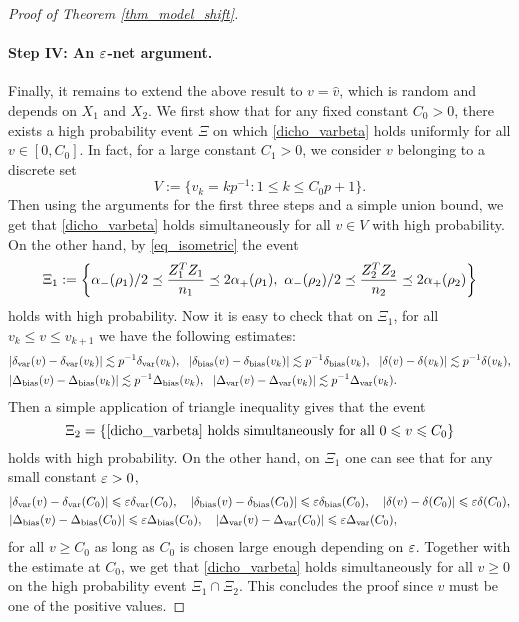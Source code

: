 \begin{proof}[Proof of Theorem \ref{thm_model_shift}]
\paragraph{Step IV: An $\e$-net argument.} Finally, it remains to extend the above result to $v=\hat v$, which is random and depends on $X_1$ and $X_2$. We first show that for any fixed constant $C_0>0$, there exists a high probability event $\Xi$ on which \eqref{dicho_varbeta} 
holds uniformly for all $v\in [0, C_0]$. In fact, for a large constant $C_1>0$, we consider $v$ belonging to a discrete set 
$$V:=\{v_k = kp^{-1}: 1\le k \le C_0p +1\}.$$
Then using the arguments for the first three steps and a simple union bound, we get that
\eqref{dicho_varbeta} holds simultaneously for all $v\in V$ with high probability. On the other hand, by \eqref{eq_isometric} the event
$$\Xi_1:=\left\{ \al_-(\rho_1)/2 \preceq  \frac{Z_1^T Z_1}{n_1}  \preceq   2\al_+(\rho_1) ,\  \al_-(\rho_2)/2 \preceq  \frac{Z_2^T Z_2}{n_2}  \preceq   2\al_+(\rho_2)\right\}$$
holds with high probability. Now it is easy to check that on $\Xi_1$, for all $v_k \le v\le v_{k+1}$ we have the following estimates:
\begin{align*}
& |\delta_{\vari}(v) -\delta_{\vari}(v_k)|\lesssim p^{-1}\delta_{\vari}(v_k),\ \ |\delta_{\bias}(v) -\delta_{\bias}(v_k)|\lesssim p^{-1}\delta_{\bias}(v_k), \ \   |\delta(v)-\delta(v_k)|\lesssim p^{-1}\delta(v_k),\\
& |\Delta_{\bias}(v) -\Delta_{\bias}(v_k)|\lesssim p^{-1}\Delta_{\bias}(v_k),\ \ |\Delta_{\vari}(v) -\Delta_{\vari}(v_k)|\lesssim p^{-1}\Delta_{\vari}(v_k).
\end{align*}
Then a simple application of triangle inequality gives that the event 
$$\Xi_2=\{\eqref{dicho_varbeta} \text{ holds simultaneously for all }0\le v \le C_0\}$$
holds with high probability. On the other hand, on $\Xi_1$ one can see that for any small constant $\e>0$,
\begin{align*}
& |\delta_{\vari}(v) -\delta_{\vari}(C_0)|\le \e\delta_{\vari}(C_0),\quad |\delta_{\bias}(v) -\delta_{\bias}(C_0)|\le \e\delta_{\bias}(C_0), \quad  |\delta(v)-\delta(C_0)|\le \e\delta(C_0),\\
& |\Delta_{\bias}(v) -\Delta_{\bias}(C_0)|\le \e\Delta_{\bias}(C_0),\quad |\Delta_{\vari}(v) -\Delta_{\vari}(C_0)|\le \e\Delta_{\vari}(C_0),
\end{align*}
for all $v\ge C_0$ as long as $C_0$ is chosen large enough depending on $\e$. Together with the estimate at $C_0$, we get that \eqref{dicho_varbeta} holds simultaneously for all $v\ge 0$ on the high probability event $\Xi_1\cap \Xi_2$. This concludes the proof since $v$ must be one of the positive values.
\end{proof}

